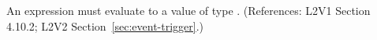 An \Event {} expression must evaluate to a value of type
.  (References: L2V1 Section 4.10.2; L2V2
Section~\ref{sec:event-trigger}.)
